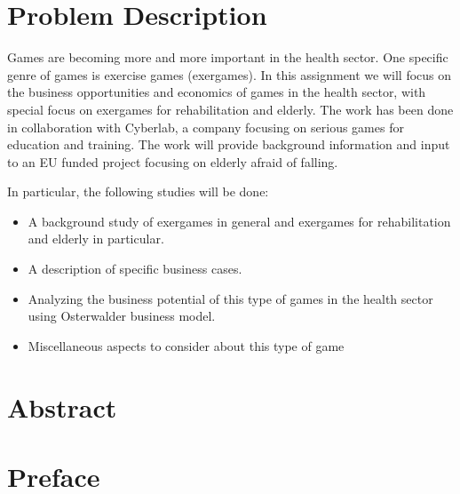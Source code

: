 \documentclass[b5paper,twoside,openright,11pt]{report}
\begin{document}
\chapter*{Problem Description} 
Games are becoming more and more important in the health sector. One specific genre of games is exercise games (exergames). In this assignment we will focus on the business opportunities and economics of games in the health sector, with special focus on exergames for rehabilitation and elderly. The work has been done in collaboration with Cyberlab, a company focusing on serious games for education and training. The work will provide background information and input to an EU funded project focusing on elderly afraid of falling.

In particular, the following studies will be done: 
\begin{itemize}
\renewcommand{\labelitemi}{$\bullet$}
\item A background study of exergames in general and exergames for rehabilitation and elderly in particular.
\item	A description of specific business cases.
\item	Analyzing the business potential of this type of games in the health sector using Osterwalder business model.
\item	Miscellaneous aspects to consider about this type of game
\end{itemize}
\cleardoublepage
\chapter*{Abstract}
\cleardoublepage
\chapter*{Preface}
\cleardoublepage
{}
\tableofcontents
\cleardoublepage

\cleardoublepage
\listoffigures
\cleardoublepage
\listoftables
\cleardoublepage
{}

\cleardoublepage

\cleardoublepage

\cleardoublepage

\cleardoublepage

\cleardoublepage

\cleardoublepage

\cleardoublepage

\cleardoublepage

\cleardoublepage


\cleardoublepage

\end{document}
